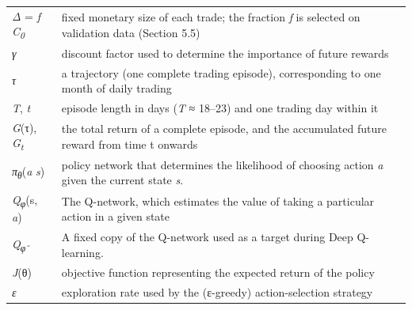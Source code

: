 {\begin{longtable}[]{@{}
  >{\raggedright\arraybackslash}p{}
  >{\raggedright\arraybackslash}p{}@{}}
\rowsep
\emph{Δ} = \emph{f} \emph{C\textsubscript{0}} & fixed monetary size of
each trade; the fraction \emph{f} is selected on validation data
(Section 5.5) \\
\rowsep
\emph{γ} & discount factor used to determine the importance of future
rewards \\
\rowsep
\emph{τ} & a trajectory (one complete trading episode), corresponding to
one month of daily trading \\
\rowsep
\emph{T}, \emph{t} & episode length in days (\emph{T} ≈ 18--23) and one
trading day within it \\
\rowsep
\emph{G}(τ), \emph{G\textsubscript{t}} & the total return of a complete
episode, and the accumulated future reward from time t onwards \\
\rowsep
\emph{π\textsubscript{θ}}(\emph{a} \textbar{} \emph{s}) & policy network
that determines the likelihood of choosing action \emph{a} given the
current state \emph{s}. \\
\rowsep
\emph{Q\textsubscript{φ}}(s, \emph{a}) & The Q-network, which estimates
the value of taking a particular action in a given state \\
\rowsep
\emph{Q\textsubscript{φ⁻}} & A fixed copy of the Q-network used as a
target during Deep Q-learning. \\
\rowsep
\emph{J}(θ) & objective function representing the expected return of the
policy \\
\rowsep
\emph{ε} & exploration rate used by the (ε-greedy) action-selection
strategy \\
\end{longtable}
}

